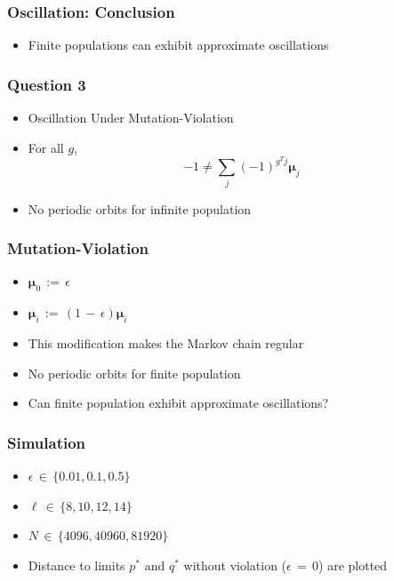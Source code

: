 \documentclass[aspectratio=169]{beamer}
\begin{document}
  \begin{frame}
    \frametitle{Oscillation: Conclusion}
    \begin{itemize}
      \setlength\itemsep{1em}
      \item{Finite populations can exhibit approximate oscillations}             
    \end{itemize}
  \end{frame}
  
  \begin{frame}
    \frametitle{Question 3}
    \begin{itemize}
      \item{Oscillation Under Mutation-Violation}
      \item{
      For all $g$,
	\[
	  -1 \neq \sum \limits_{j} (-1)^{g^T j} \bm{\mu}_j      
	\]
      }
      \item{No periodic orbits for infinite population}      
    \end{itemize}
  \end{frame}
  
  \begin{frame}
    \frametitle{Mutation-Violation}
    \begin{itemize}
      \setlength\itemsep{1em}   
      \item{$\bm{\mu}_0 \,:=\, \epsilon$}
      \item{$\bm{\mu}_i \,:=\, (1 \,-\, \epsilon)\bm{\mu}_i$}
      \item{This modification makes the Markov chain regular}
      \item{No periodic orbits for finite population}      
      \item{Can finite population exhibit approximate oscillations?}
    \end{itemize}
  \end{frame}
  
  
  \begin{frame}
    \frametitle{Simulation}
    \begin{itemize}
      \setlength\itemsep{1em}
      \item{$\epsilon \,\in\, \{0.01, 0.1, 0.5\}$}      
      \item{$\ell \,\in\, \{8, 10, 12, 14\}$}
      \item{$N \,\in\, \{4096, 40960, 81920\}$}
      \item{Distance to limits $p^\ast$ and  $q^\ast$ without violation ($\epsilon \,=\, 0$) are plotted }
    \end{itemize}
  \end{frame}
  
\end{document}
